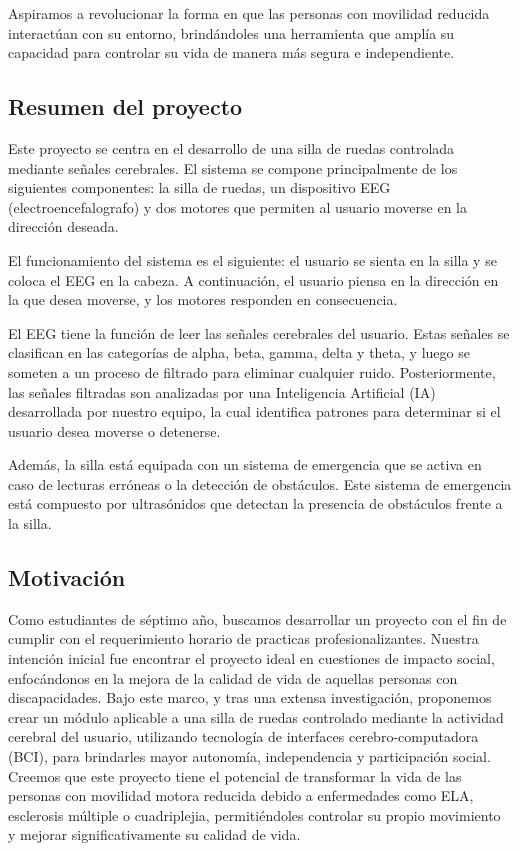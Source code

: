 \documentclass{article}
\begin{document}
Aspiramos a revolucionar la forma en que las personas con movilidad reducida interactúan con su entorno, brindándoles una herramienta que amplía su capacidad para controlar su vida de manera más segura e independiente.

\subsection{Resumen del proyecto}
Este proyecto se centra en el desarrollo de una silla de ruedas controlada mediante señales cerebrales. El sistema se compone principalmente de los siguientes componentes: la silla de ruedas, un dispositivo EEG (electroencefalografo) y dos motores que permiten al usuario moverse en la dirección deseada.

El funcionamiento del sistema es el siguiente: el usuario se sienta en la silla y se coloca el EEG en la cabeza. A continuación, el usuario piensa en la dirección en la que desea moverse, y los motores responden en consecuencia.

El EEG tiene la función de leer las señales cerebrales del usuario. Estas señales se clasifican en las categorías de alpha, beta, gamma, delta y theta, y luego se someten a un proceso de filtrado para eliminar cualquier ruido. Posteriormente, las señales filtradas son analizadas por una Inteligencia Artificial (IA) desarrollada por nuestro equipo, la cual identifica patrones para determinar si el usuario desea moverse o detenerse.

Además, la silla está equipada con un sistema de emergencia que se activa en caso de lecturas erróneas o la detección de obstáculos. Este sistema de emergencia está compuesto por ultrasónidos que detectan la presencia de obstáculos frente a la silla.

\subsection{Motivación}
Como estudiantes de séptimo año, buscamos desarrollar un proyecto con el fin de cumplir con el requerimiento horario de practicas profesionalizantes. Nuestra intención inicial fue encontrar el proyecto ideal en cuestiones de impacto social, enfocándonos en la mejora de la calidad de vida de aquellas personas con discapacidades. Bajo este marco, y tras una extensa investigación, proponemos crear un módulo aplicable a una silla de ruedas controlado mediante la actividad cerebral del usuario, utilizando tecnología de interfaces cerebro-computadora (BCI), para brindarles mayor autonomía, independencia y participación social.   Creemos que este proyecto tiene el potencial de transformar la vida de las personas con movilidad motora reducida debido a enfermedades como ELA, esclerosis múltiple o cuadriplejia, permitiéndoles controlar su propio movimiento y mejorar significativamente su calidad de vida.
\end{document}
